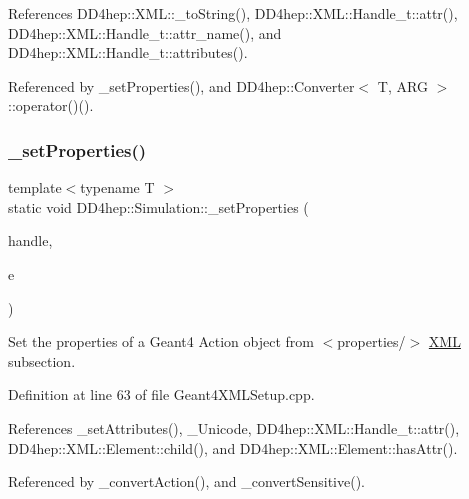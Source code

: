 References D\+D4hep\+::\+X\+M\+L\+::\+\_\+to\+String(), D\+D4hep\+::\+X\+M\+L\+::\+Handle\+\_\+t\+::attr(), D\+D4hep\+::\+X\+M\+L\+::\+Handle\+\_\+t\+::attr\+\_\+name(), and D\+D4hep\+::\+X\+M\+L\+::\+Handle\+\_\+t\+::attributes().



Referenced by \+\_\+set\+Properties(), and D\+D4hep\+::\+Converter$<$ T, A\+R\+G $>$\+::operator()().

\hypertarget{namespace_d_d4hep_1_1_simulation_a3f99c3ce830efd1ab0e5b5a04216cbb4}{}\label{namespace_d_d4hep_1_1_simulation_a3f99c3ce830efd1ab0e5b5a04216cbb4} 
\subsubsection{\texorpdfstring{\+\_\+set\+Properties()}{\_setProperties()}}
{\footnotesize\ttfamily template$<$typename T $>$ \\
static void D\+D4hep\+::\+Simulation\+::\+\_\+set\+Properties (\begin{DoxyParamCaption}\item[{const \hyperlink{class_t}{T} \&}]{handle,  }\item[{\hyperlink{_det_factory_helper_8h_ac13b3c79d2bc9214ff0cf5b8dc43dda6}{xml\+\_\+h} \&}]{e }\end{DoxyParamCaption})\hspace{0.3cm}{\ttfamily [static]}}



Set the properties of a Geant4 Action object from $<$properties/$>$ \hyperlink{namespace_d_d4hep_1_1_x_m_l}{X\+ML} subsection. 



Definition at line 63 of file Geant4\+X\+M\+L\+Setup.\+cpp.



References \+\_\+set\+Attributes(), \+\_\+\+Unicode, D\+D4hep\+::\+X\+M\+L\+::\+Handle\+\_\+t\+::attr(), D\+D4hep\+::\+X\+M\+L\+::\+Element\+::child(), and D\+D4hep\+::\+X\+M\+L\+::\+Element\+::has\+Attr().



Referenced by \+\_\+convert\+Action(), and \+\_\+convert\+Sensitive().

\hypertarget{namespace_d_d4hep_1_1_simulation_a5af9f919753af128d90ae3bc13dc1c34}{}\label{namespace_d_d4hep_1_1_simulation_a5af9f919753af128d90ae3bc13dc1c34} 
